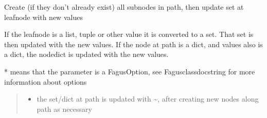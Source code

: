 \documentclass[a4paper,10pt,english]{sphinxmanual}
\begin{document}
\begin{fulllineitems}
\begin{fulllineitems}
\label{\detokenize{fagus:fagus.Fagus.update}}
\pysigstartsignatures
{}
\pysigstopsignatures
\sphinxAtStartPar
Create (if they don’t already exist) all sub\sphinxhyphen{}nodes in path, then update set at leaf\sphinxhyphen{}node with new values

\sphinxAtStartPar
If the leaf\sphinxhyphen{}node is a list, tuple or other value it is converted to a set. That set is then updated with the new
values. If the node at path is a dict, and values also is a dict, the node\sphinxhyphen{}dict is updated with the new values.

\sphinxAtStartPar
* means that the parameter is a FagusOption, see Fagus\sphinxhyphen{}class\sphinxhyphen{}docstring for more information about options
\begin{quote}\begin{description}
\begin{itemize}
\item {}
\sphinxAtStartPar
{} \textendash{} the set/dict at path is updated with \textasciitilde{}, after creating new nodes along path as necessary


\end{itemize}
\end{description}
\end{quote}
\end{fulllineitems}
\end{fulllineitems}
\end{document}

